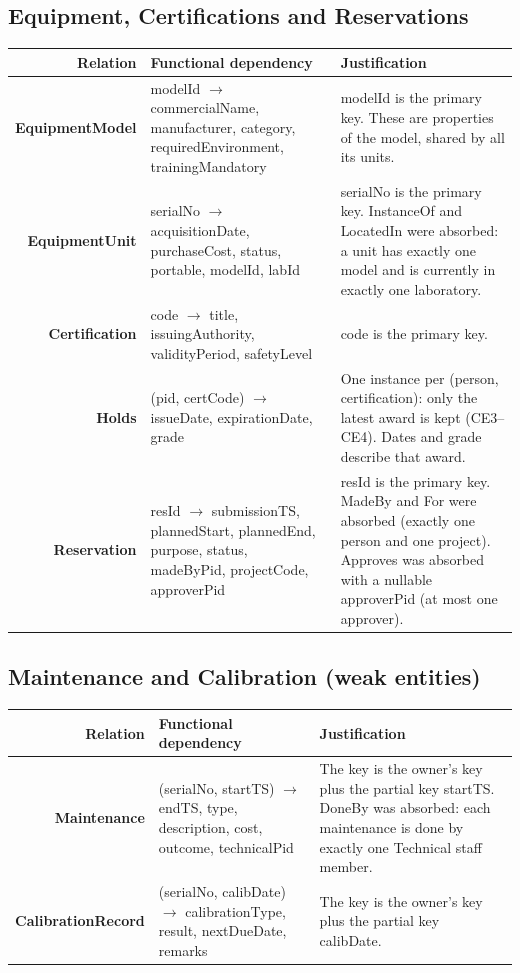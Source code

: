 \documentclass[11pt,a4paper]{article}
\newcommand{\fd}{\ensuremath{\rightarrow}}
\newcommand{\rel}[1]{\textbf{#1}}
\begin{document}
\subsection{Equipment, Certifications and Reservations}
\begin{longtable}{R F J}
\toprule
\textbf{Relation} & \textbf{Functional dependency} & \textbf{Justification}\\
\midrule
\endhead
\rel{EquipmentModel} & modelId \fd{} commercialName, manufacturer, category, requiredEnvironment, trainingMandatory & modelId is the primary key. These are properties of the model, shared by all its units.\\
\rel{EquipmentUnit} & serialNo \fd{} acquisitionDate, purchaseCost, status, portable, modelId, labId & serialNo is the primary key. InstanceOf and LocatedIn were absorbed: a unit has exactly one model and is currently in exactly one laboratory.\\
\rel{Certification} & code \fd{} title, issuingAuthority, validityPeriod, safetyLevel & code is the primary key.\\
\rel{Holds} & (pid, certCode) \fd{} issueDate, expirationDate, grade & One instance per (person, certification): only the latest award is kept (CE3--CE4). Dates and grade describe that award.\\
\rel{Reservation} & resId \fd{} submissionTS, plannedStart, plannedEnd, purpose, status, madeByPid, projectCode, approverPid & resId is the primary key. MadeBy and For were absorbed (exactly one person and one project). Approves was absorbed with a nullable approverPid (at most one approver).\\
\bottomrule
\end{longtable}

\subsection{Maintenance and Calibration (weak entities)}
\begin{longtable}{R F J}
\toprule
\textbf{Relation} & \textbf{Functional dependency} & \textbf{Justification}\\
\midrule
\endhead
\rel{Maintenance} & (serialNo, startTS) \fd{} endTS, type, description, cost, outcome, technicalPid & The key is the owner's key plus the partial key startTS. DoneBy was absorbed: each maintenance is done by exactly one Technical staff member.\\
\rel{CalibrationRecord} & (serialNo, calibDate) \fd{} calibrationType, result, nextDueDate, remarks & The key is the owner's key plus the partial key calibDate.\\
\bottomrule
\end{longtable}
\end{document}
